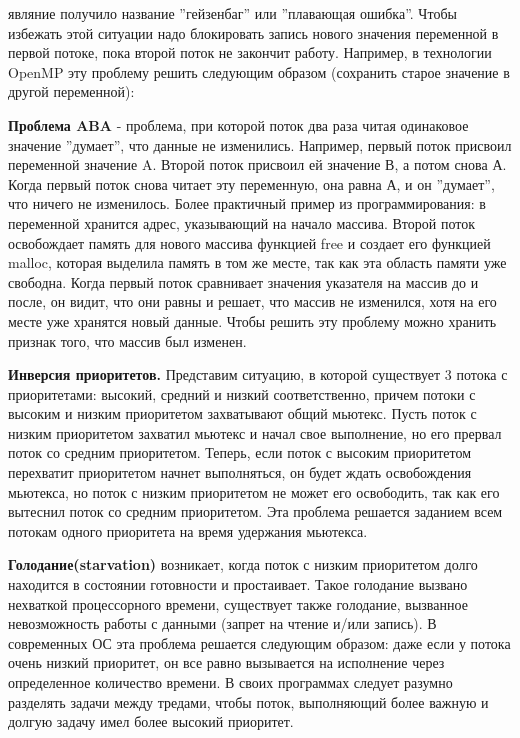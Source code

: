 {	\begin{figure}[H]
		
	\end{figure}
	 являние получило название ''гейзенбаг'' или ''плавающая ошибка''. Чтобы избежать этой ситуации надо блокировать запись нового значения переменной в первой потоке, пока второй поток не закончит работу. Например, в технологии OpenMP эту проблему решить следующим образом (сохранить старое значение в другой переменной):
	\begin{figure}[H]
		
	\end{figure}
	\par\textbf{Проблема ABA} - проблема, при которой поток два раза читая одинаковое значение ''думает'', что данные не изменились. Например, первый поток присвоил переменной значение A. Второй поток присвоил ей значение В, а потом снова А. Когда первый поток снова читает эту переменную, она равна А, и он ''думает'', что ничего не изменилось. Более практичный пример из программирования: в переменной хранится адрес, указывающий на начало массива. Второй поток освобождает память для нового массива функцией free и создает его функцией malloc, которая выделила память в том же месте, так как эта область памяти уже свободна. Когда первый поток сравнивает значения указателя на массив до и после, он видит, что они равны и решает, что массив не изменился, хотя на его месте уже хранятся новый данные. Чтобы решить эту проблему можно хранить признак того, что массив был изменен.
	\par\textbf{Инверсия приоритетов.} Представим ситуацию, в которой существует 3 потока с приоритетами: высокий, средний и низкий соответственно, причем потоки с высоким и низким приоритетом захватывают общий мьютекс. Пусть поток с низким приоритетом захватил мьютекс и начал свое выполнение, но его прервал поток со средним приоритетом. Теперь, если поток с высоким приоритетом перехватит приоритетом начнет выполняться, он будет ждать освобождения мьютекса, но поток с низким приоритетом не может его освободить, так как его вытеснил поток со средним приоритетом. Эта проблема решается заданием всем потокам одного приоритета на время удержания мьютекса.
	\par\textbf{Голодание(starvation)} возникает, когда поток с низким приоритетом долго находится в состоянии готовности и простаивает. Такое голодание вызвано нехваткой процессорного времени, существует также голодание, вызванное невозможность работы с данными (запрет на чтение и/или запись). В современных ОС эта проблема решается следующим образом: даже если у потока очень низкий приоритет, он все равно вызывается на исполнение через определенное количество времени. В своих программах следует разумно разделять задачи между тредами, чтобы поток, выполняющий более важную и долгую задачу имел более высокий приоритет.
}
